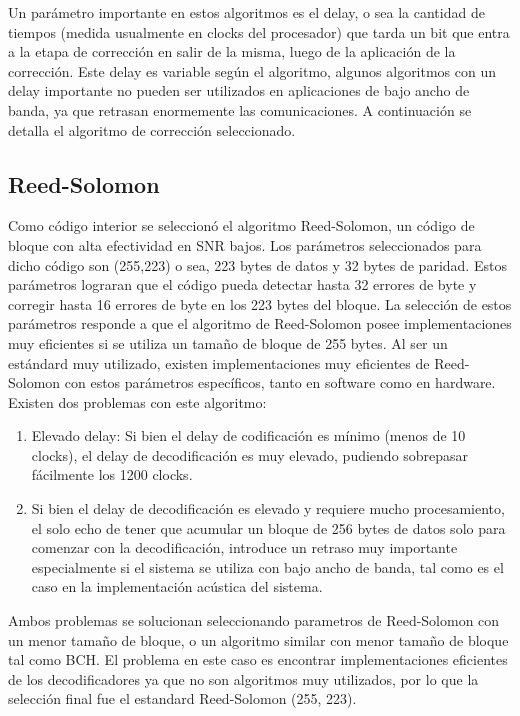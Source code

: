 Un parámetro importante en estos algoritmos es el delay, o sea la cantidad de tiempos (medida usualmente en clocks del procesador) que tarda un bit que entra a la etapa de corrección en salir de la misma, luego de la aplicación de la corrección. Este delay es variable según el algoritmo, algunos algoritmos con un delay importante no pueden ser utilizados en aplicaciones de bajo ancho de banda, ya que retrasan enormemente las comunicaciones. A continuación se detalla el algoritmo de corrección seleccionado.

\subsection{Reed-Solomon}
Como código interior se seleccionó el algoritmo Reed-Solomon, un código de bloque con alta efectividad en SNR bajos. Los parámetros seleccionados para dicho código son (255,223) o sea, 223 bytes de datos y 32 bytes de paridad. Estos parámetros lograran que el código pueda detectar hasta 32 errores de byte y corregir hasta 16 errores de byte en los 223 bytes del bloque. La selección de estos parámetros responde a que el algoritmo de Reed-Solomon posee implementaciones muy eficientes si se utiliza un tamaño de bloque de 255 bytes. 
Al ser un estándard muy utilizado, existen implementaciones muy eficientes de Reed-Solomon con estos parámetros específicos, tanto en software como en hardware.
Existen dos problemas con este algoritmo:
\begin{enumerate}
 \item Elevado delay: Si bien el delay de codificación es mínimo (menos de 10 clocks), el delay de decodificación es muy elevado, pudiendo sobrepasar fácilmente los 1200 clocks.
 \item Si bien el delay de decodificación es elevado y requiere mucho procesamiento, el solo echo de tener que acumular un bloque de 256 bytes de datos solo para comenzar con la decodificación, introduce un retraso muy importante especialmente si el sistema se utiliza con bajo ancho de banda, tal como es el caso en la implementación acústica del sistema.
\end{enumerate}
 
Ambos problemas se solucionan seleccionando parametros de Reed-Solomon con un menor tamaño de bloque, o un algoritmo similar con menor tamaño de bloque tal como BCH. El problema en este caso es encontrar implementaciones eficientes de los decodificadores ya que no son algoritmos muy utilizados, por lo que la selección final fue el estandard Reed-Solomon (255, 223).

